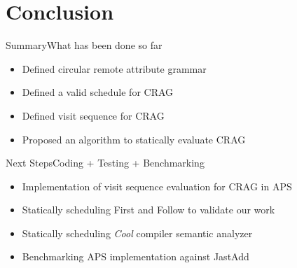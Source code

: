 \section{Conclusion}

\begin{frame}{Summary}{What has been done so far}

\begin{itemize}
    \item Defined circular remote attribute grammar
    \item Defined a valid schedule for CRAG
    \item Defined visit sequence for CRAG
    \item \alert{Proposed} an algorithm to statically evaluate CRAG
\end{itemize}
\end{frame}

\begin{frame}{Next Steps}{Coding + Testing + Benchmarking}

\begin{itemize}
    \item \alert{Implementation} of visit sequence evaluation for CRAG in APS
    \item Statically scheduling First and Follow to validate our work
    \item Statically scheduling \emph{Cool} compiler semantic analyzer
    \item Benchmarking APS implementation against JastAdd
\end{itemize}

\end{frame}


